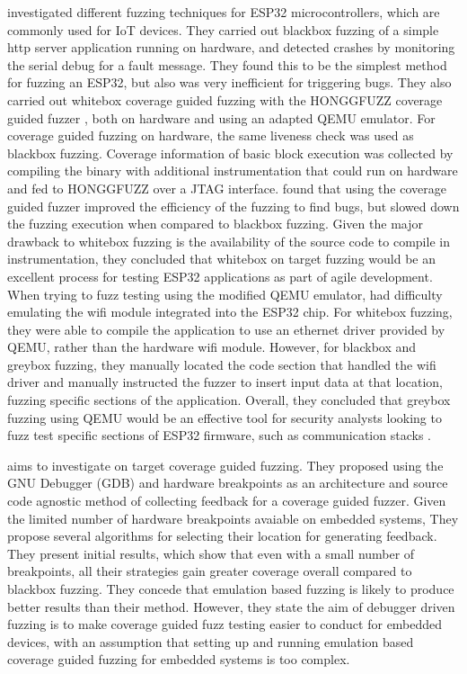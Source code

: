 \documentclass[../report.tex]{subfiles}
\begin{document}
\citet{Borsig_2020} investigated different fuzzing techniques for ESP32
microcontrollers, which are commonly used for IoT devices. They carried out
blackbox fuzzing of a simple http server application running on hardware, and
detected crashes by monitoring the serial debug for a fault message. They found
this to be the simplest method for fuzzing an ESP32, but also was very
inefficient for triggering bugs. They also carried out whitebox coverage guided
fuzzing with the HONGGFUZZ coverage guided fuzzer \citep{Honggfuzz}, both on
hardware and using an adapted QEMU emulator. For coverage guided fuzzing on
hardware, the same liveness check was used as blackbox fuzzing. Coverage
information of basic block execution was collected by compiling the binary with
additional instrumentation that could run on hardware and fed to HONGGFUZZ over
a JTAG interface. \citet{Borsig_2020} found that using the coverage guided
fuzzer improved the efficiency of the fuzzing to find bugs, but slowed down the
fuzzing execution when compared to blackbox fuzzing. Given the major drawback
to whitebox fuzzing is the availability of the source code to compile in
instrumentation, they concluded that whitebox on target fuzzing would be an
excellent process for testing ESP32 applications as part of agile development.
When trying to fuzz testing using the modified QEMU emulator,
\citet{Borsig_2020} had difficulty emulating the wifi module integrated into
the ESP32 chip. For whitebox fuzzing, they were able to compile the application
to use an ethernet driver provided by QEMU, rather than the hardware wifi
module. However, for blackbox and greybox fuzzing, they manually located the
code section that handled the wifi driver and manually instructed the fuzzer to
insert input data at that location, fuzzing specific sections of the
application. Overall, they concluded that greybox fuzzing using QEMU would be
an effective tool for security analysts looking to fuzz test specific sections
of ESP32 firmware, such as communication stacks \citep{Borsig_2020}.

\citet{Eisele_2022} aims to investigate on target coverage guided fuzzing. They
proposed using the GNU Debugger (GDB) and hardware breakpoints as an
architecture and source code agnostic method of collecting feedback for a
coverage guided fuzzer. Given the limited number of hardware breakpoints
avaiable on embedded systems, They propose several algorithms for selecting
their location for generating feedback. They present initial results, which
show that even with a small number of breakpoints, all their strategies gain
greater coverage overall compared to blackbox fuzzing. They concede that
emulation based fuzzing is likely to produce better results than their method.
However, they state the aim of debugger driven fuzzing is to make coverage
guided fuzz testing easier to conduct for embedded devices, with an assumption
that setting up and running emulation based coverage guided fuzzing for
embedded systems is too complex.
\end{document}
